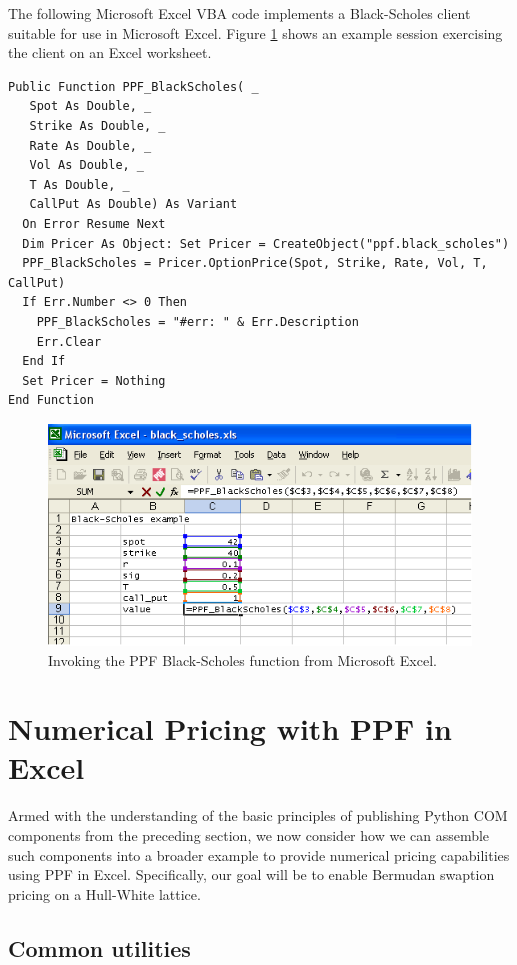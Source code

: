 The following Microsoft Excel VBA code implements a Black-Scholes
client suitable for use in Microsoft Excel. Figure
\ref{fig:invoke-black-scholes-from-vba} shows an example session
exercising the client on an Excel worksheet.
\begin{verbatim}
Public Function PPF_BlackScholes( _
   Spot As Double, _
   Strike As Double, _
   Rate As Double, _
   Vol As Double, _
   T As Double, _
   CallPut As Double) As Variant
  On Error Resume Next
  Dim Pricer As Object: Set Pricer = CreateObject("ppf.black_scholes")
  PPF_BlackScholes = Pricer.OptionPrice(Spot, Strike, Rate, Vol, T, CallPut)
  If Err.Number <> 0 Then
    PPF_BlackScholes = "#err: " & Err.Description
    Err.Clear
  End If
  Set Pricer = Nothing
End Function
\end{verbatim}
\begin{figure}
\centering
\includegraphics[scale=0.5]{img/black_scholes.PNG}
\caption{Invoking the PPF Black-Scholes function from Microsoft Excel.}
\label{fig:invoke-black-scholes-from-vba}
\end{figure}

\section{Numerical Pricing with PPF in Excel}

Armed with the understanding of the basic principles of publishing
Python COM components from the preceding section, we now consider how
we can assemble such components into a broader example to provide
numerical pricing capabilities using PPF in Excel. Specifically, our
goal will be to enable Bermudan swaption pricing on a Hull-White
lattice.

\subsection{Common utilities}

